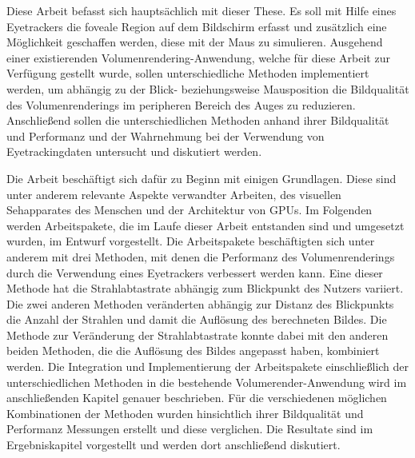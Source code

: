 Diese Arbeit befasst sich hauptsächlich mit dieser These.
Es soll mit Hilfe eines Eyetrackers die foveale Region auf dem Bildschirm erfasst und zusätzlich eine Möglichkeit geschaffen werden, diese mit der Maus zu simulieren.
Ausgehend einer existierenden Volumenrendering-Anwendung, welche für diese Arbeit zur Verfügung gestellt wurde, sollen unterschiedliche Methoden implementiert werden, um abhängig zu der Blick- beziehungsweise Mausposition die Bildqualität des Volumenrenderings im peripheren Bereich des Auges zu reduzieren.
Anschließend sollen die unterschiedlichen Methoden anhand ihrer Bildqualität und Performanz und der Wahrnehmung bei der Verwendung von Eyetrackingdaten untersucht und diskutiert werden.

Die Arbeit beschäftigt sich dafür zu Beginn mit einigen Grundlagen. 
Diese sind unter anderem relevante Aspekte verwandter Arbeiten, des visuellen Sehapparates des Menschen und der Architektur von GPUs.
Im Folgenden werden Arbeitspakete, die im Laufe dieser Arbeit entstanden sind und umgesetzt wurden, im Entwurf vorgestellt.
Die Arbeitspakete beschäftigten sich unter anderem mit drei Methoden, mit denen die Performanz des Volumenrenderings durch die Verwendung eines Eyetrackers verbessert werden kann.
Eine dieser Methode hat die Strahlabtastrate abhängig zum Blickpunkt des Nutzers variiert.
Die zwei anderen Methoden veränderten abhängig zur Distanz des Blickpunkts die Anzahl der Strahlen und damit die Auflösung des berechneten Bildes.
Die Methode zur Veränderung der Strahlabtastrate konnte dabei mit den anderen beiden Methoden, die die Auflösung des Bildes angepasst haben, kombiniert werden.
Die Integration und Implementierung der Arbeitspakete einschließlich der unterschiedlichen Methoden in die bestehende Volumerender-Anwendung wird im anschließenden Kapitel genauer beschrieben.
Für die verschiedenen möglichen Kombinationen der Methoden wurden hinsichtlich ihrer Bildqualität und Performanz Messungen erstellt und diese verglichen.
Die Resultate sind im Ergebniskapitel vorgestellt und werden dort anschließend diskutiert.